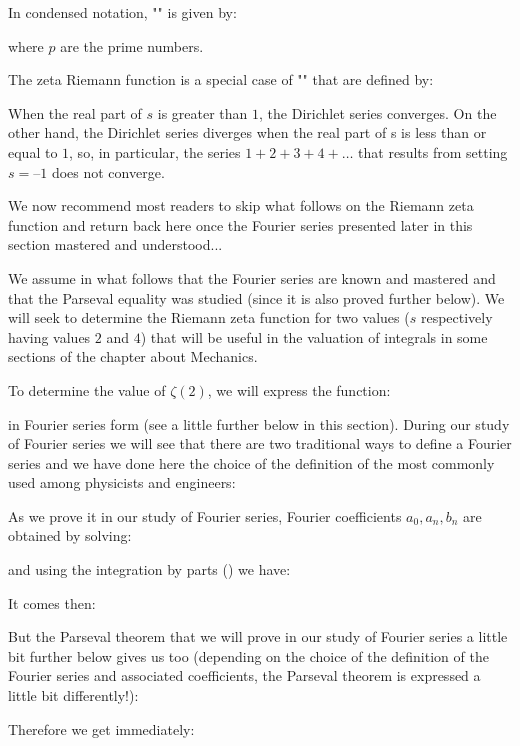 	In condensed notation, "" is given by:
	
	where $p$ are the prime numbers.
	\begin{tcolorbox}[title=Remark,colframe=black,arc=10pt]
	The zeta Riemann function is a special case of "" that are defined by:
	
	When the real part of $s$ is greater than $1$, the Dirichlet series converges. On the other hand, the Dirichlet series diverges when the real part of s is less than or equal to $1$, so, in particular, the series $1 + 2 + 3 + 4 + \ldots$ that results from setting $s = –1$ does not converge.
	\end{tcolorbox}
	We now recommend most readers to skip what follows on the Riemann zeta function and return back here once the Fourier series presented later in this section mastered and understood...
	
	We assume in what follows that the Fourier series are known and mastered and that the Parseval equality was studied (since it is also proved further below). We will seek to determine the Riemann zeta function for two values ($s$ respectively having values $2$ and $4$) that will be useful in the valuation of integrals in some sections of the chapter about Mechanics.
	
	To determine the value of $\zeta (2)$, we will express the function:
	
	in Fourier series form (see a little further below in this section). During our study of Fourier series we will see that there are two traditional ways to define a Fourier series and we have done here the choice of the definition of the most commonly used among physicists and engineers:
	
	As we prove it in our study of Fourier series, Fourier coefficients $a_0,a_n,b_n$ are obtained by solving:
	
	and using the integration by parts () we have:
	
	It comes then:
	
	But the Parseval theorem that we will prove in our study of Fourier series a little bit further below gives us too (depending on the choice of the definition of the Fourier series and associated coefficients, the Parseval theorem is expressed a little bit differently!):
	
	Therefore we get immediately:
	
